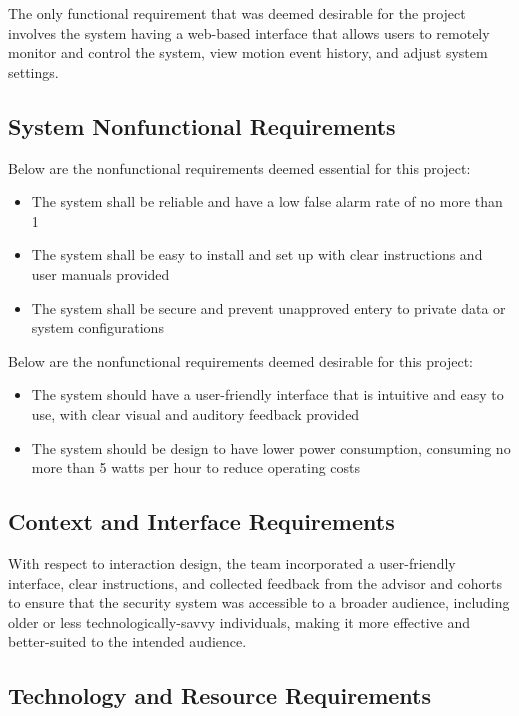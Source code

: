 \documentclass[conference]{IEEEtran}
\begin{document}
The only functional requirement that was deemed desirable for the project involves the
system having a web-based interface that allows users to remotely monitor and control the
system, view motion event history, and adjust system settings.

\subsection{System Nonfunctional Requirements}

Below are the nonfunctional requirements deemed essential for this project:
\begin{itemize}
      \item The system shall be reliable and have a low false alarm rate of no more than 1%
      \item The system shall be easy to install and set up with clear instructions and user manuals provided
      \item The system shall be secure and prevent unapproved entery to private data or system configurations
\end{itemize}

Below are the nonfunctional requirements deemed desirable for this project:
\begin{itemize}
      \item The system should have a user-friendly interface that is intuitive and easy to use, with clear visual and auditory feedback provided
      \item The system should be design to have lower power consumption, consuming no more than 5 watts per hour to reduce operating costs
\end{itemize}

\subsection{Context and Interface Requirements}

With respect to interaction design, the team incorporated a user-friendly interface, clear
instructions, and collected feedback from the advisor and cohorts to ensure that the
security system was accessible to a broader audience, including older or less
technologically-savvy individuals, making it more effective and better-suited to the
intended audience.

\subsection{Technology and Resource Requirements}
\end{document}
